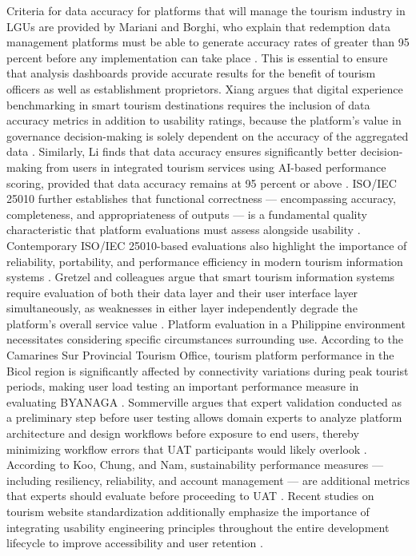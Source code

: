 \documentclass{research}
\begin{document}
Criteria for data accuracy for platforms that will manage the tourism industry in LGUs are provided by Mariani and Borghi, who explain that redemption data management platforms must be able to generate accuracy rates of greater than 95 percent before any implementation can take place \cite{mariani2022}. This is essential to ensure that analysis dashboards provide accurate results for the benefit of tourism officers as well as establishment proprietors. Xiang argues that digital experience benchmarking in smart tourism destinations requires the inclusion of data accuracy metrics in addition to usability ratings, because the platform's value in governance decision-making is solely dependent on the accuracy of the aggregated data \cite{xiang2022}. Similarly, Li finds that data accuracy ensures significantly better decision-making from users in integrated tourism services using AI-based performance scoring, provided that data accuracy remains at 95 percent or above \cite{li2023}. ISO/IEC 25010 further establishes that functional correctness — encompassing accuracy, completeness, and appropriateness of outputs — is a fundamental quality characteristic that platform evaluations must assess alongside usability \cite{iso25010}. Contemporary ISO/IEC 25010-based evaluations also highlight the importance of reliability, portability, and performance efficiency in modern tourism information systems \cite{maja2024,isoeval2020}. Gretzel and colleagues argue that smart tourism information systems require evaluation of both their data layer and their user interface layer simultaneously, as weaknesses in either layer independently degrade the platform's overall service value \cite{smarttourism2022}. Platform evaluation in a Philippine environment necessitates considering specific circumstances surrounding use. According to the Camarines Sur Provincial Tourism Office, tourism platform performance in the Bicol region is significantly affected by connectivity variations during peak tourist periods, making user load testing an important performance measure in evaluating BYANAGA \cite{camarinessur2025}. Sommerville argues that expert validation conducted as a preliminary step before user testing allows domain experts to analyze platform architecture and design workflows before exposure to end users, thereby minimizing workflow errors that UAT participants would likely overlook \cite{sommerville2021}. According to Koo, Chung, and Nam, sustainability performance measures — including resiliency, reliability, and account management — are additional metrics that experts should evaluate before proceeding to UAT \cite{koo2021}. Recent studies on tourism website standardization additionally emphasize the importance of integrating usability engineering principles throughout the entire development lifecycle to improve accessibility and user retention \cite{andag2021,reviewtourism2020}.
\end{document}
